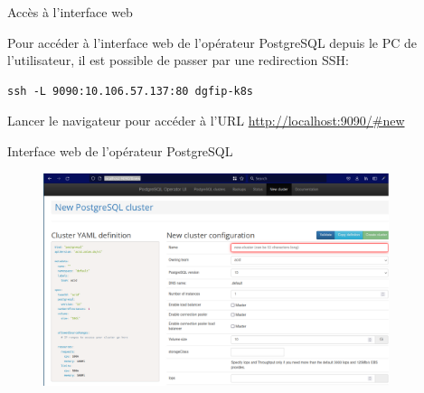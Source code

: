 
\begin{frame}[fragile]{Accès à l'interface web}
   
   Pour accéder à l'interface web de l'opérateur PostgreSQL depuis le PC de l'utilisateur, il est possible de passer par une redirection SSH:
\begin{tiny}
\begin{Verbatim}[commandchars=\&\{\}]
ssh -L 9090:10.106.57.137:80 dgfip-k8s
\end{Verbatim}
\end{tiny}

   Lancer le navigateur pour accéder à l'URL \url{http://localhost:9090/#new}

\end{frame}


\begin{frame}[fragile]{Interface web de l'opérateur PostgreSQL}

\begin{figure}
\begin{center}
\includegraphics[angle=0, width=0.9\textwidth, height=0.9\textheight]{images/postgres-operator-ui.eps}
\end{center}
\end{figure}

\end{frame}


